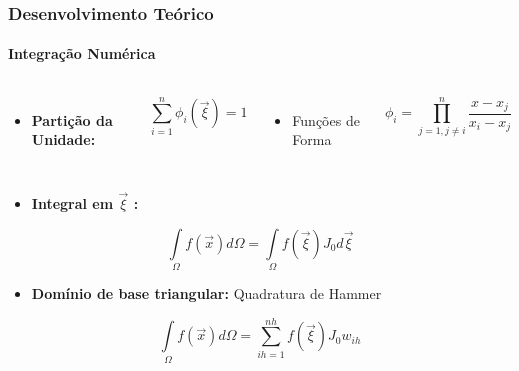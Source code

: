 \documentclass{beamer}
\begin{document}
\begin{frame}
    \frametitle{Desenvolvimento Teórico}
        \framesubtitle{Integração Numérica} 

        \begin{columns}

            \begin{itemize}
                \item \textbf{Partição da Unidade:}
            \end{itemize}
    
            \begin{equation}
                \sum_{i=1}^{n} \phi_i\left(\vec{\xi}\right) = 1
            \end{equation}

            \begin{itemize}
                \item Funções de Forma
            \end{itemize}
            \begin{equation}
                \phi_i = \prod_{j=1,j\neq i}^{n} \frac{x-x_j}{x_i-x_j}
            \end{equation}
  
            
        \end{columns}




        \begin{itemize}
            \item \textbf{Integral em \(\vec{\xi}\) :}
        \end{itemize}

        \begin{equation}
            \int\limits_{\Omega} f(\vec{x}) d\Omega = \int\limits_{\Omega} f\left(\vec{\xi}\right) J_0 d\vec{\xi}
        \end{equation}

        \begin{itemize}
            \item \textbf{Domínio de base triangular:} Quadratura de Hammer
        \end{itemize}

        \begin{equation}
            \int\limits_{\Omega} f\left(\vec{x}\right) d\Omega = \sum_{ih=1}^{nh} f\left(\vec{\xi}\right) J_0 w_{ih}
        \end{equation}

\end{frame}
\end{document}
